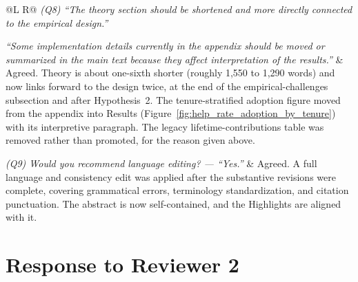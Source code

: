 \documentclass[11pt]{article}
\begin{document}
\begin{longtable}{@{}L R@{}}
\textit{(Q8) ``The theory section should be shortened and more directly connected to the empirical design.''}

\textit{``Some implementation details currently in the appendix should be moved or summarized in the main text because they affect interpretation of the results.''} &
Agreed. Theory is about one-sixth shorter (roughly 1{,}550 to 1{,}290 words) and now links forward to the design twice, at the end of the empirical-challenges subsection and after Hypothesis~2. The tenure-stratified adoption figure moved from the appendix into Results (Figure~\ref{fig:help_rate_adoption_by_tenure}) with its interpretive paragraph. The legacy lifetime-contributions table was removed rather than promoted, for the reason given above. \\
\midrule

\textit{(Q9) Would you recommend language editing? --- ``Yes.''} &
Agreed. A full language and consistency edit was applied after the substantive revisions were complete, covering grammatical errors, terminology standardization, and citation punctuation. The abstract is now self-contained, and the Highlights are aligned with it. \\

\end{longtable}

\section*{Response to Reviewer 2}
\end{document}
